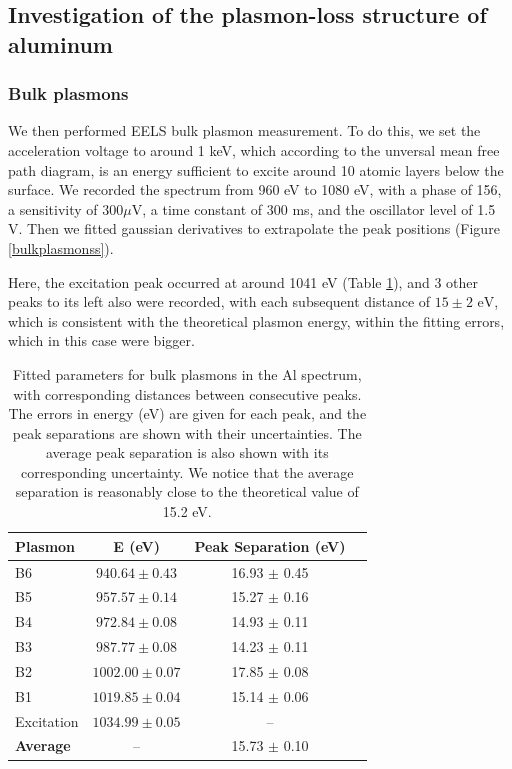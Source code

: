 \documentclass[12pt]{article}
\begin{document}
\subsection{Investigation of the plasmon-loss structure of aluminum}
\subsubsection{Bulk plasmons}
We then performed EELS bulk plasmon measurement. To do this, we set the acceleration voltage to around 1 keV, which according to the unversal mean free path diagram, is an energy sufficient to excite around 10 atomic layers below the surface. We recorded the spectrum from 960 eV to 1080 eV, with a phase of 156\degree, a sensitivity of $300 \mu $V, a time constant of 300 ms, and the oscillator level of 1.5 V.
Then we fitted gaussian derivatives to extrapolate the peak positions (Figure \ref{bulkplasmonss}).

Here, the excitation peak occurred at around 1041 eV (Table \ref{tab:mu_distances1}), and 3 other peaks to its left also were recorded, with each subsequent distance of $15 \pm 2 \text{ eV}$, which is consistent with the theoretical plasmon energy, within the fitting errors, which in this case were bigger. %


\begin{table}[h!]
    \centering
    \begin{tabular}{lccc}
        \toprule
        \textbf{Plasmon} & \textbf{E (eV)} & \textbf{Peak Separation (eV)} \\
        \midrule
        B6          & $940.64 \pm 0.43$  & 16.93 $\pm$ 0.45 \\
        B5          & $957.57 \pm 0.14$  & 15.27 $\pm$ 0.16 \\
        B4          & $972.84 \pm 0.08$  & 14.93 $\pm$ 0.11 \\
        B3          & $987.77 \pm 0.08$  & 14.23 $\pm$ 0.11 \\
        B2          & $1002.00 \pm 0.07$ & 17.85 $\pm$ 0.08 \\
        B1          & $1019.85 \pm 0.04$ & 15.14 $\pm$ 0.06 \\
        Excitation  & $1034.99 \pm 0.05$ & -- \\
        \midrule
        \textbf{Average}  & --  & 15.73 $\pm$ 0.10 \\
        \bottomrule
    \end{tabular}
    \caption{Fitted parameters for bulk plasmons in the Al spectrum, with corresponding distances between consecutive peaks. The errors in energy (eV) are given for each peak, and the peak separations are shown with their uncertainties. The average peak separation is also shown with its corresponding uncertainty. We notice that the average separation is reasonably close to the theoretical value of 15.2 eV.}
    \label{tab:mu_distances1}
\end{table}
\end{document}
